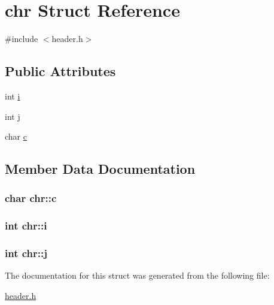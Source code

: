 \hypertarget{structchr}{}\section{chr Struct Reference}
\label{structchr}


{\ttfamily \#include $<$header.\+h$>$}

\subsection*{Public Attributes}
\begin{DoxyCompactItemize}
\item 
int \hyperlink{structchr_a2323410d322bb37c34fdd5693de59e7a}{i}
\item 
int \hyperlink{structchr_a69527a3d53540372a67c8827cc8464c8}{j}
\item 
char \hyperlink{structchr_a0037556755f9c76cd4cdd7b982d05514}{c}
\end{DoxyCompactItemize}


\subsection{Member Data Documentation}
\hypertarget{structchr_a0037556755f9c76cd4cdd7b982d05514}{}
\subsubsection[{c}]{\setlength{\rightskip}{0pt plus 5cm}char chr\+::c}\label{structchr_a0037556755f9c76cd4cdd7b982d05514}
\hypertarget{structchr_a2323410d322bb37c34fdd5693de59e7a}{}
\subsubsection[{i}]{\setlength{\rightskip}{0pt plus 5cm}int chr\+::i}\label{structchr_a2323410d322bb37c34fdd5693de59e7a}
\hypertarget{structchr_a69527a3d53540372a67c8827cc8464c8}{}
\subsubsection[{j}]{\setlength{\rightskip}{0pt plus 5cm}int chr\+::j}\label{structchr_a69527a3d53540372a67c8827cc8464c8}


The documentation for this struct was generated from the following file\+:\begin{DoxyCompactItemize}
\item 
\hyperlink{header_8h}{header.\+h}\end{DoxyCompactItemize}
